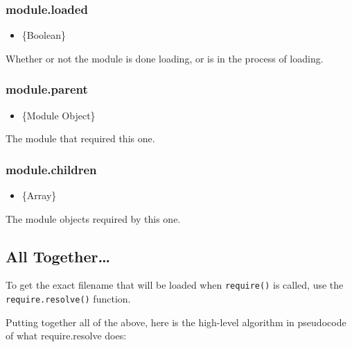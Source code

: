 \subsubsection{module.loaded}

\begin{itemize}
\item
  \{Boolean\}
\end{itemize}

Whether or not the module is done loading, or is in the process of
loading.

\subsubsection{module.parent}

\begin{itemize}
\item
  \{Module Object\}
\end{itemize}

The module that required this one.

\subsubsection{module.children}

\begin{itemize}
\item
  \{Array\}
\end{itemize}

The module objects required by this one.

\subsection{All Together\ldots{}}

To get the exact filename that will be loaded when \texttt{require()} is
called, use the \texttt{require.resolve()} function.

Putting together all of the above, here is the high-level algorithm in
pseudocode of what require.resolve does:

